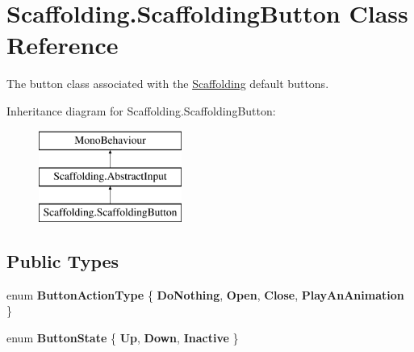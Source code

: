 \hypertarget{class_scaffolding_1_1_scaffolding_button}{\section{Scaffolding.\-Scaffolding\-Button Class Reference}
\label{class_scaffolding_1_1_scaffolding_button}
}


The button class associated with the \hyperlink{namespace_scaffolding}{Scaffolding} default buttons.  


Inheritance diagram for Scaffolding.\-Scaffolding\-Button\-:\begin{figure}[H]
\begin{center}
\leavevmode
\includegraphics[height=3.000000cm]{class_scaffolding_1_1_scaffolding_button}
\end{center}
\end{figure}
\subsection*{Public Types}
\begin{DoxyCompactItemize}
\item 
enum {\bfseries Button\-Action\-Type} \{ {\bfseries Do\-Nothing}, 
{\bfseries Open}, 
{\bfseries Close}, 
{\bfseries Play\-An\-Animation}
 \}
\item 
enum {\bfseries Button\-State} \{ {\bfseries Up}, 
{\bfseries Down}, 
{\bfseries Inactive}
 \}
\end{DoxyCompactItemize}
